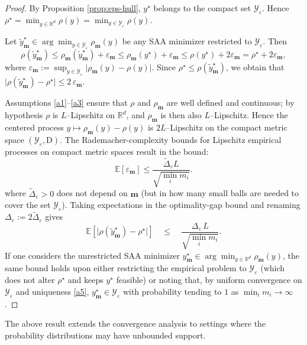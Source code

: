 \documentclass[letter,11pt, reqno]{amsart}
\newcommand{\D}{\mathrm{D}}
\renewcommand{\;}{\quad}
\theoremstyle{thmstyleone}%
\theoremstyle{thmstyletwo}%
\theoremstyle{thmstylethree}%
\begin{document}
\begin{proof}
By Proposition \ref{prop:eps-hull}, $y^\star$ belongs to the compact set $\mathcal Y_\varepsilon$. Hence $
\rho^\star=\min_{y\in\mathbb R^d}\rho(y)=\min_{y\in\mathcal Y_\varepsilon}\rho(y)$. 

Let $\tilde y^\star_{\mathbf m}\in\arg\min_{y\in\mathcal Y_\varepsilon}\rho_{\mathbf m}(y)$ be any SAA minimizer restricted to $\mathcal Y_\varepsilon$. Then
$$
\rho(\tilde y^\star_{\mathbf m})
\le \rho_{\mathbf m}(\tilde y^\star_{\mathbf m})+\varepsilon_{\mathbf m}
\le \rho_{\mathbf m}(y^\star)+\varepsilon_{\mathbf m}
\le \rho(y^\star)+2\varepsilon_{\mathbf m}
= \rho^\star+2\varepsilon_{\mathbf m},
$$
where $\varepsilon_{\mathbf m}:=\sup_{y\in\mathcal Y_\varepsilon}\big|\rho_{\mathbf m}(y)-\rho(y)\big|$. Since  $\rho^\star\le \rho(\tilde y^\star_{\mathbf m})$, we obtain that $
\big|\rho(\tilde y^\star_{\mathbf m})-\rho^\star\big|\le 2\,\varepsilon_{\mathbf m}$. 

Assumptions \ref{a1}--\ref{a3} ensure that $\rho$ and $\rho_{\mathbf m}$ are well defined and continuous; by hypothesis $\rho$ is $L$–Lipschitz on $\mathbb R^d$, and $\rho_{\mathbf m}$ is then also $L$–Lipschitz. Hence the centered process $y\mapsto \rho_{\mathbf m}(y)-\rho(y)$ is $2L$–Lipschitz on the compact metric space $(\mathcal Y_\varepsilon,\D)$. The  Rademacher-complexity bounds for Lipschitz empirical processes
on compact metric spaces \citep[see, e.g.,][]{ShapiroDentchevaRuszczynski2014} result in the bound:
$$
\mathbb E[\varepsilon_{\mathbf m}] \le\frac{\tilde\Delta_\varepsilon L}{\sqrt{\min_i m_i}}.
$$
where $\tilde\Delta_\varepsilon>0$ does not depend on $\mathbf m$ (but in how many small balls are needed to cover the set $\mathcal Y_\varepsilon$). Taking expectations in the optimality-gap bound and renaming $\Delta_\varepsilon:=2\tilde\Delta_\varepsilon$ gives
$$
\mathbb E\!\left[\big|\rho(\tilde y^\star_{\mathbf m})-\rho^\star\big|\right]
\;\le\; \frac{\Delta_\varepsilon\,L}{\sqrt{\min_i m_i}}.
$$
If one considers the unrestricted SAA minimizer $y^\star_{\mathbf m}\in\arg\min_{y\in\mathbb R^d}\rho_{\mathbf m}(y)$, the same bound holds upon either restricting the empirical problem to $\mathcal Y_\varepsilon$ (which does not alter $\rho^\star$ and keeps $y^\star$ feasible) or noting that, by uniform convergence on $\mathcal Y_\varepsilon$ and uniqueness \ref{a5}, $y^\star_{\mathbf m}\in\mathcal Y_\varepsilon$ with probability tending to $1$ as $\min_i m_i\to\infty$. 
\end{proof}
The above result extends the convergence analysis to settings where the probability distributions may have unbounded support. 
\end{document}
